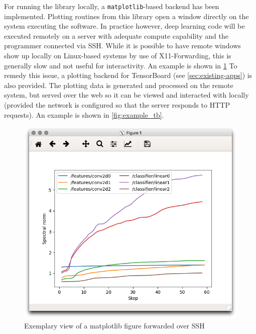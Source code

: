 For running the library locally, a \texttt{matplotlib}-based backend has been
implemented.  Plotting routines from this library open a window directly on the
system executing the software. In practice however, deep learning code will be
executed remotely on a server with adequate compute capability and the
programmer connected via SSH. While it is possible to have remote windows show
up locally on Linux-based systems by use of X11-Forwarding, this is generally
slow and not useful for interactivity. An example is shown in
\cref{fig:example_mpl} To remedy this issue, a plotting backend for TensorBoard
(see \cref{sec:existing-apps}) is also provided. The plotting data is generated
and processed on the remote system, but served over the web so it can be viewed
and interacted with locally (provided the network is configured so that the
server responds to HTTP requests). An example is shown in \cref{fig:example_tb}.

\begin{figure}
    \hypertarget{fig:example_mpl}{%
        \centering
        \includegraphics[max width=\textwidth]{gfx/diagrams/software_screens/example_mpl.png}
        \caption{Exemplary view of a matplotlib figure forwarded over SSH}\label{fig:example_mpl}
    }
\end{figure}

